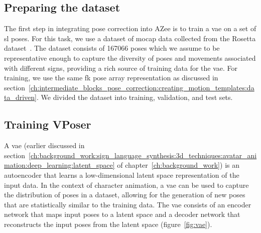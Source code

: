 \documentclass[../../main.tex]{subfiles}
\begin{document}
\subsection{Preparing the dataset}
\label{ch:intermediate_blocks_pose_correction:pose_correction_with_azee:dataset}

The first step in integrating pose correction into AZee is to train a \gls{vae} on a set of \gls{sl} poses. For this task, we use a dataset of \gls{mocap} data collected from the Rosetta dataset~\cite{bertin2022rosetta}. The dataset consists of 167066 poses which we assume to be representative enough to capture the diversity of poses and movements associated with different signs, providing a rich source of training data for the \gls{vae}. For training, we use the same \gls{fk} pose array representation as discussed in section~\ref{ch:intermediate_blocks_pose_correction:creating_motion_templates:data_driven}. We divided the dataset into training, validation, and test sets.

\subsection{Training VPoser}
\label{ch:intermediate_blocks_pose_correction:pose_correction_with_azee:training}

A \gls{vae} (earlier discussed in section~\ref{ch:background_work:sign_language_synthesis:3d_techniques:avatar_animation:deep_learning:latent_space} of chapter~\ref{ch:background_work}) is an autoencoder that learns a low-dimensional latent space representation of the input data. In the context of character animation, a \gls{vae} can be used to capture the distribution of poses in a dataset, allowing for the generation of new poses that are statistically similar to the training data. The \gls{vae} consists of an encoder network that maps input poses to a latent space and a decoder network that reconstructs the input poses from the latent space (figure~\ref{fig:vae}).
\end{document}
